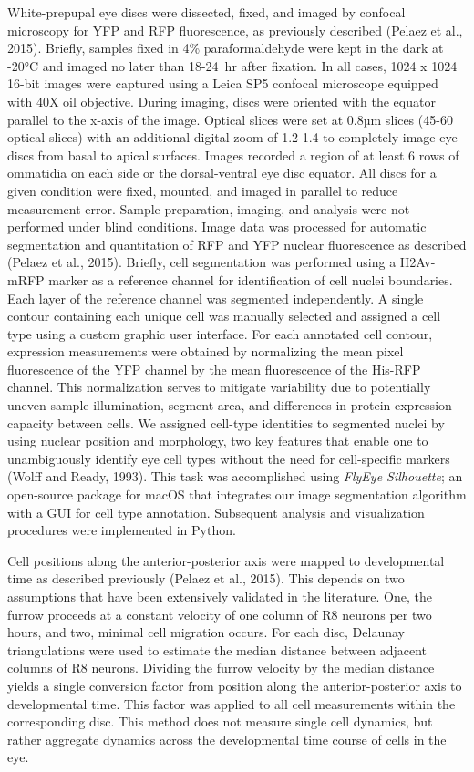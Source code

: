 White-prepupal eye discs were dissected, fixed, and imaged by confocal microscopy for YFP and RFP fluorescence, as previously described (Pelaez et al., 2015). Briefly, samples fixed in 4\% paraformaldehyde were kept in the dark at -20°C and imaged no later than 18-24~hr after fixation. In all cases, 1024 x 1024 16-bit images were captured using a Leica SP5 confocal microscope equipped with 40X oil objective. During imaging, discs were oriented with the equator parallel to the x-axis of the image. Optical slices were set at 0.8µm slices (45-60 optical slices) with an additional digital zoom of 1.2-1.4 to completely image eye discs from basal to apical surfaces. Images recorded a region of at least 6 rows of ommatidia on each side or the dorsal-ventral eye disc equator. All discs for a given condition were fixed, mounted, and imaged in parallel to reduce measurement error. Sample preparation, imaging, and analysis were not performed under blind conditions. Image data was processed for automatic segmentation and quantitation of RFP and YFP nuclear fluorescence as described (Pelaez et al., 2015). Briefly, cell segmentation was performed using a H2Av-mRFP marker as a reference channel for identification of cell nuclei boundaries. Each layer of the reference channel was segmented independently. A single contour containing each unique cell was manually selected and assigned a cell type using a custom graphic user interface. For each annotated cell contour, expression measurements were obtained by normalizing the mean pixel fluorescence of the YFP channel by the mean fluorescence of the His-RFP channel. This normalization serves to mitigate variability due to potentially uneven sample illumination, segment area, and differences in protein expression capacity between cells. We assigned cell-type identities to segmented nuclei by using nuclear position and morphology, two key features that enable one to unambiguously identify eye cell types without the need for cell-specific markers (Wolff and Ready, 1993). This task was accomplished using \emph{FlyEye Silhouette}; an open-source package for macOS that integrates our image segmentation algorithm with a GUI for cell type annotation. Subsequent analysis and visualization procedures were implemented in Python.

Cell positions along the anterior-posterior axis were mapped to developmental time as described previously (Pelaez et al., 2015). This depends on two assumptions that have been extensively validated in the literature. One, the furrow proceeds at a constant velocity of one column of R8 neurons per two hours, and two, minimal cell migration occurs. For each disc, Delaunay triangulations were used to estimate the median distance between adjacent columns of R8 neurons. Dividing the furrow velocity by the median distance yields a single conversion factor from position along the anterior-posterior axis to developmental time. This factor was applied to all cell measurements within the corresponding disc. This method does not measure single cell dynamics, but rather aggregate dynamics across the developmental time course of cells in the eye.

